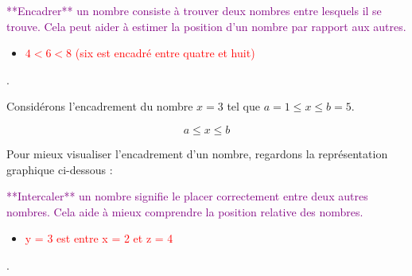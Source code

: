 \documentclass{article}
\begin{document}
\textcolor{purple}{**Encadrer** un nombre consiste à trouver deux nombres entre lesquels il se trouve. Cela peut aider à estimer la position d'un nombre par rapport aux autres.}

\vspace{0.25cm}

\begin{tcolorbox}[colback=orange!10!white, colframe=orange!75!black, title=\textcolor{white}{Exemples}, sharp corners=southwest]

\begin{itemize}
    \item \textcolor{red}{\(4 < 6 < 8\) (six est encadré entre quatre et huit)}
\end{itemize}.
\end{tcolorbox}

Considérons l'encadrement du nombre \(x = 3\) tel que \(a = 1 \leq x \leq b = 5\).

\[
a \leq x \leq b
\]

Pour mieux visualiser l'encadrement d'un nombre, regardons la représentation graphique ci-dessous :

\begin{center}
\end{center}

\textcolor{purple}{**Intercaler** un nombre signifie le placer correctement entre deux autres nombres. Cela aide à mieux comprendre la position relative des nombres.}

\vspace{0.4cm}

\begin{tcolorbox}[colback=orange!10!white, colframe=orange!75!black, title=\textcolor{white}{Exemples}, sharp corners=southwest]

\begin{itemize}
    \item \textcolor{red}{y = 3 est entre x = 2 et z = 4}
\end{itemize}.
\end{tcolorbox}
\end{document}

